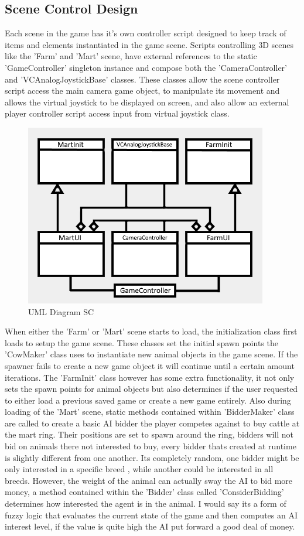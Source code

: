 \subsection{Scene Control Design}
Each scene in the game has it's own controller script designed to keep track of items and elements instantiated in the game scene. Scripts controlling 3D scenes like the 'Farm' and 'Mart' scene, have external references to the static 'GameController' singleton instance and compose both the 'CameraController' and 'VCAnalogJoystickBase' classes. These classes allow the scene controller script access the main camera game object, to manipulate its movement and allows the virtual joystick to be displayed on screen, and also allow an external player controller script access input from virtual joystick class.
\begin{figure}[!ht]
	\caption{UML Diagram SC}
	\centering
	\includegraphics{img/scene_uml.png}
\end{figure}
When either the 'Farm' or 'Mart' scene starts to load, the initialization class first loads to setup the game scene. These classes set the initial spawn points the 'CowMaker' class uses to instantiate new animal objects in the game scene. If the spawner fails to create a new game object it will continue until a certain amount iterations. The 'FarmInit' class however has some extra functionality, it not only sets the spawn points for animal objects but also determines if the user requested to either load a previous saved game or create a new game entirely. 
Also during loading of the 'Mart' scene, static methods contained within 'BidderMaker' class are called to create a basic AI bidder the player competes against to buy cattle at the mart ring. Their positions are set to spawn around the ring, bidders will not bid on animals there not interested to buy, every bidder thats created at runtime is slightly different from one another. Its completely random, one bidder might be only interested in a specific breed , while another could be interested in all breeds. However, the weight of the animal can actually sway the AI to bid more money, a method contained within the 'Bidder' class called 'ConsiderBidding' determines how interested the agent is in the animal. I would say its a form of fuzzy logic that evaluates the current state of the game and then computes an AI interest level, if the value is quite high the AI put forward a good deal of money.
